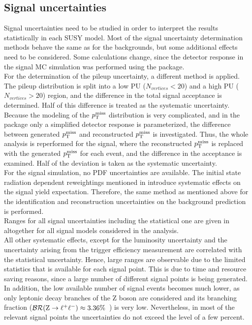 \subsection{Signal uncertainties}
Signal uncertainties need to be studied in order to interpret the results statistically in each SUSY model.
Most of the signal uncertainty determination methods behave the same as for the backgrounds, but some additional effects need to be considered. Some calculations change, since the detector response in the signal MC simulation was performed using the \FASTSIM package.\\
For the determination of the pileup uncertainty, a different method is applied. The pileup distribution is split into a low PU ($N_{vertices}<20$) and a high PU ($N_{vertices}>20$) region, and the difference in the total signal acceptance is determined. Half of this difference is treated as the systematic uncertainty.\\
Because the modeling of the $p_{\mathrm{T}}^\text{miss}$ distribution is very complicated, and in the \FASTSIM package only a simplified detector response is parameterized, the difference between generated $p_{\mathrm{T}}^\text{miss}$ and reconstructed $p_{\mathrm{T}}^\text{miss}$ is investigated. Thus, the whole analysis is reperformed for the signal, where the reconstructed $p_{\mathrm{T}}^\text{miss}$ is replaced with the generated $p_{\mathrm{T}}^\text{miss}$ for each event, and the difference in the acceptance is examined. Half of the deviation is taken as the systematic uncertainty.\\
For the signal simulation, no PDF uncertainties are available. The initial state radiation dependent reweightings mentioned in  introduce systematic effects on the signal yield expectation. Therefore, the same method as mentioned above for the identification and reconstruction uncertainties on the background prediction is performed.\\
Ranges for all signal uncertainties including the statistical one are given in  altogether for all signal models considered in the analysis.\\
All other systematic effects, except for the luminosity uncertainty and the uncertainty arising from the trigger efficiency measurement are correlated with the statistical uncertainty.
Hence, large ranges are observable due to the limited statistics that is available for each signal point. This is due to time and resource saving reasons, since a large number of different signal points is being generated. In addition, the low available number of signal events becomes much lower, as only leptonic decay branches of the Z boson are considered and its branching fraction ($\mathcal{BR}(\mathrm{Z}\to\ell^+\ell^-)\approx3.36\%$~\cite{PDG}) is very low. Nevertheless, in most of the relevant signal points the uncertainties do not exceed the level of a few percent.
